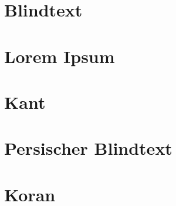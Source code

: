 \documentclass{scrartcl}
\begin{document}
	
	\section{Blindtext}
		\Blindtext
	
	\section{Lorem Ipsum}
		\lipsum[1-150]
	
	\section{Kant}
		\kant[1-164]
	
	\section{Persischer Blindtext}
		\textfarsi{\ptext}
	
	\section{Koran}
		\textarabic{\quransurah[1-114]}
\end{document}
